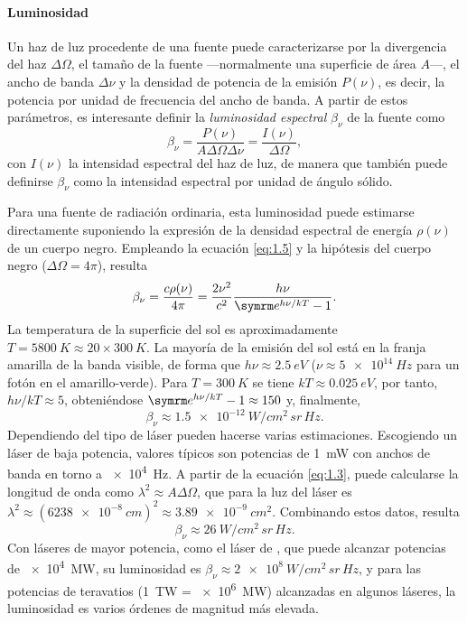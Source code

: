 \paragraph{Luminosidad}\label{par:1.1.2.4}
Un haz de luz procedente de una fuente puede caracterizarse por la divergencia del haz $\Delta\Omega$, el tamaño de la fuente ---normalmente una superficie de área $A$---, el ancho de banda $\Delta\nu$ y la densidad de potencia de la emisión $P(\nu)$, es decir, la potencia por unidad de frecuencia del ancho de banda\autocite{Milonni1988}. A partir de estos parámetros, es interesante definir la \emph{luminosidad espectral} $\beta_{\nu}$ de la fuente como 
\begin{equation}\label{eq:1.5}
    \beta_{\nu} = \frac{P(\nu)}{A\Delta\Omega\Delta\nu} = \frac{I(\nu)}{\Delta\Omega},
\end{equation}
con $I(\nu)$ la intensidad espectral del haz de luz, de manera que también puede definirse $\beta_{\nu}$ como la intensidad espectral por unidad de ángulo sólido.

Para una fuente de radiación ordinaria, esta luminosidad puede estimarse directamente suponiendo la expresión de la densidad espectral de energía $\rho(\nu)$ de un cuerpo negro. Empleando la ecuación \eqref{eq:1.5} y la hipótesis del cuerpo negro ($\Delta\Omega=4 \pi$), resulta
\begin{equation}\label{eq:1.6}
    \beta_{\nu} = \frac{c \rho(\nu)}{4 \pi} = \frac{2 \nu^{2}}{c^{2}}\frac{h \nu}{\eu^{h \nu/kT}-1}.
\end{equation}
La temperatura de la superficie del sol es aproximadamente $T = \qty{5800}{K} \approx 20 \times \qty{300}{K}$. La mayoría de la emisión del sol está en la franja amarilla de la banda visible, de forma que $h\nu \approx \qty{2,5}{eV}$ ($\nu \approx \qty{5e14}{Hz}$ para un fotón en el amarillo-verde). Para $T = \qty{300}{K}$ se tiene $kT \approx \qty{0,025}{eV}$, por tanto, $h \nu/kT \approx 5$, obteniéndose $\eu^{h \nu/kT}-1 \approx 150$ y, finalmente,
\begin{equation}\label{eq:1.7}
    \beta_{\nu} \approx \qty{1,5e-12}{W/cm^{2}\,sr\,Hz}.
\end{equation}
Dependiendo del tipo de láser pueden hacerse varias estimaciones. Escogiendo un láser  de baja potencia, valores típicos\autocite{Milonni1988} son potencias de \qty{1}{mW} con anchos de banda en torno a \qty{e4}{Hz}. A partir de la ecuación \eqref{eq:1.3}, puede calcularse la longitud de onda como $\lambda^{2} \approx A\Delta\Omega$, que para la luz del láser  es $\lambda^{2} \approx (\qty{6238e-8}{cm})^{2} \approx \qty{3,89e-9}{cm^{2}}$. Combinando estos datos, resulta 
\begin{equation}\label{eq:1.8}
    \beta_{\nu} \approx \qty{26}{W/cm^{2}\,sr\,Hz}.
\end{equation}
Con láseres de mayor potencia, como el láser de , que puede alcanzar potencias de \qty{e4}{MW}, su luminosidad es $\beta_{\nu} \approx \qty{2e8}{W/cm^{2}\,sr\,Hz}$, y para las potencias de teravatios (\qty{1}{TW} = \qty{e6}{MW}) alcanzadas en algunos láseres, la luminosidad es varios órdenes de magnitud más elevada.


